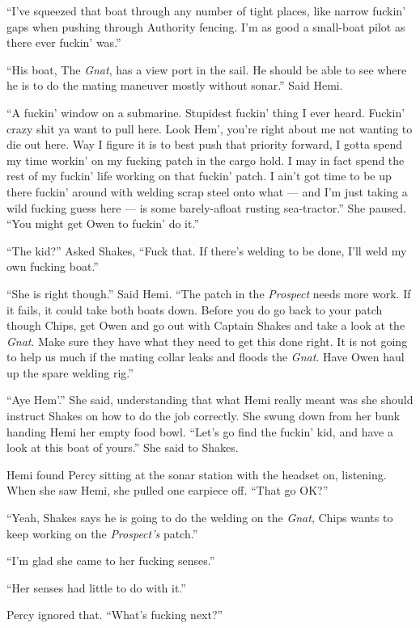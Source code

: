 \documentclass[]{scrbook}
\begin{document}
``I've squeezed that boat through any number of tight places, like
narrow fuckin' gaps when pushing through Authority fencing. I'm as good
a small-boat pilot as there ever fuckin' was.''

``His boat, The \emph{Gnat}, has a view port in the sail. He should be
able to see where he is to do the mating maneuver mostly without
sonar.'' Said Hemi.

``A fuckin' window on a submarine. Stupidest fuckin' thing I ever heard.
Fuckin' crazy shit ya want to pull here. Look Hem', you're right about
me not wanting to die out here. Way I figure it is to best push that
priority forward, I gotta spend my time workin' on my fucking patch in
the cargo hold. I may in fact spend the rest of my fuckin' life working
on that fuckin' patch. I ain't got time to be up there fuckin' around
with welding scrap steel onto what --- and I'm just taking a wild
fucking guess here --- is some barely-afloat rusting sea-tractor.'' She
paused. ``You might get Owen to fuckin' do it.''

``The kid?'' Asked Shakes, ``Fuck that. If there's welding to be done,
I'll weld my own fucking boat.''

``She is right though.'' Said Hemi. ``The patch in the \emph{Prospect}
needs more work. If it fails, it could take both boats down. Before you
do go back to your patch though Chips, get Owen and go out with Captain
Shakes and take a look at the \emph{Gnat}. Make sure they have what they
need to get this done right. It is not going to help us much if the
mating collar leaks and floods the \emph{Gnat}. Have Owen haul up the
spare welding rig.''

``Aye Hem'.'' She said, understanding that what Hemi really meant was
she should instruct Shakes on how to do the job correctly. She swung
down from her bunk handing Hemi her empty food bowl. ``Let's go find the
fuckin' kid, and have a look at this boat of yours.'' She said to
Shakes.

Hemi found Percy sitting at the sonar station with the headset on,
listening. When she saw Hemi, she pulled one earpiece off. ``That go
OK?''

``Yeah, Shakes says he is going to do the welding on the \emph{Gnat},
Chips wants to keep working on the \emph{Prospect's} patch.''

``I'm glad she came to her fucking senses.''

``Her senses had little to do with it.''

Percy ignored that. ``What's fucking next?''
\end{document}
